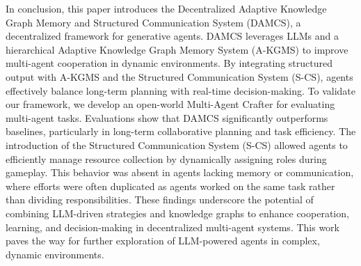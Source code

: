 In conclusion, this paper introduces the Decentralized Adaptive Knowledge Graph Memory and Structured Communication System (DAMCS), a decentralized framework for generative agents. DAMCS leverages LLMs and a hierarchical Adaptive Knowledge Graph Memory System (A-KGMS) to improve multi-agent cooperation in dynamic environments. By integrating structured output with A-KGMS and the Structured Communication System (S-CS), agents effectively balance long-term planning with real-time decision-making. 
To validate our framework, we develop an open-world Multi-Agent Crafter for evaluating multi-agent tasks. Evaluations show that DAMCS significantly outperforms baselines, particularly in long-term collaborative planning and task efficiency. The introduction of the Structured Communication System (S-CS) allowed agents to efficiently manage resource collection by dynamically assigning roles during gameplay. This behavior was absent in agents lacking memory or communication, where efforts were often duplicated as agents worked on the same task rather than dividing responsibilities. These findings underscore the potential of combining LLM-driven strategies and knowledge graphs to enhance cooperation, learning, and decision-making in decentralized multi-agent systems. This work paves the way for further exploration of LLM-powered agents in complex, dynamic environments.


